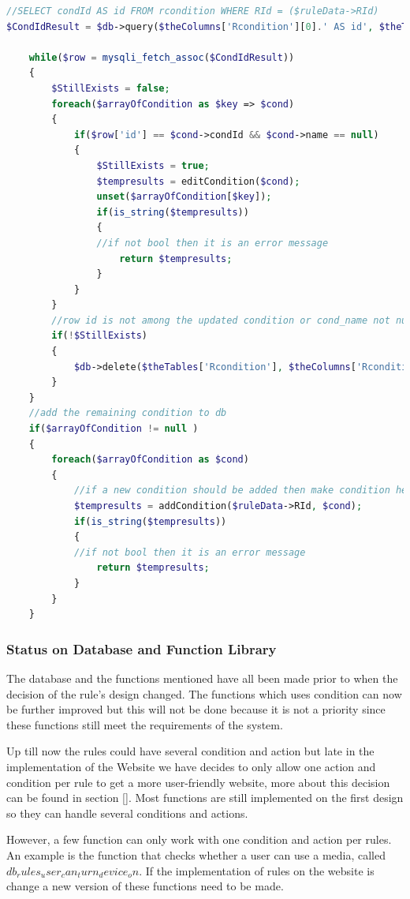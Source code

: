 \begin{lstlisting}[language=PHP, label=code:UpdateRules, caption=editRule code sample]
//SELECT condId AS id FROM rcondition WHERE RId = ($ruleData->RId)
$CondIdResult = $db->query($theColumns['Rcondition'][0].' AS id', $theTables['Rcondition'], $theColumns['Rcondition'][1] . " = " . $ruleData->RId );
				
	while($row = mysqli_fetch_assoc($CondIdResult))
	{
		$StillExists = false;
		foreach($arrayOfCondition as $key => $cond)
		{
			if($row['id'] == $cond->condId && $cond->name == null)				//edit the condition in db
			{
				$StillExists = true;
				$tempresults = editCondition($cond);
				unset($arrayOfCondition[$key]);
				if(is_string($tempresults))
				{
				//if not bool then it is an error message
					return $tempresults;
				}
			}	
		}
		//row id is not among the updated condition or cond_name not null so delete 
		if(!$StillExists)
		{
			$db->delete($theTables['Rcondition'], $theColumns['Rcondition'][0] . " = " .$row['id']);
		}
	}
	//add the remaining condition to db
	if($arrayOfCondition != null )
	{
		foreach($arrayOfCondition as $cond)
		{
			//if a new condition should be added then make condition here
			$tempresults = addCondition($ruleData->RId, $cond);
			if(is_string($tempresults))
			{
			//if not bool then it is an error message
				return $tempresults;
			}
		}
	}
\end{lstlisting}

\subsubsection{Status on Database and Function Library}
The database and the functions mentioned have all been made prior to when the decision of the rule's design changed. The functions which uses condition can now be further improved but this will not be done because it is not a priority since these functions still meet the requirements of the system.

Up till now the rules could have several condition and action but late in the implementation of the Website we have decides to only allow one action and condition per rule to get a more user-friendly website, more about this decision can be found in section \vref{}. Most functions are still implemented on the first design so they can handle several conditions and actions. 

However, a few function can only work with one condition and action per rules. An example is the function that checks whether a user can use a media, called $db_rules_user_can_turn_device_on$. If the implementation of rules on the website is change a new version of these functions need to be made.
